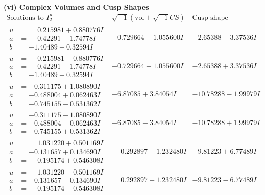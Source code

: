 \documentclass[1p]{elsarticle_modified}
\theoremstyle{definition}
\newcommand{\I}{\sqrt{-1}}
\begin{document}
\newpage\flushleft \textbf{(vi) Complex Volumes and Cusp Shapes}
$$\begin{array}{c|c|c}  
\text{Solutions to }I^u_{2}& \I (\text{vol} + \sqrt{-1}CS) & \text{Cusp shape}\\
 \hline 
\begin{aligned}
u &= \phantom{-}0.215981 + 0.880776 I \\
a &= \phantom{-}0.42291 + 1.74778 I \\
b &= -1.40489 - 0.32594 I\end{aligned}
 & -0.729664 - 1.055600 I & -2.65388 - 3.37536 I \\ \hline\begin{aligned}
u &= \phantom{-}0.215981 - 0.880776 I \\
a &= \phantom{-}0.42291 - 1.74778 I \\
b &= -1.40489 + 0.32594 I\end{aligned}
 & -0.729664 + 1.055600 I & -2.65388 + 3.37536 I \\ \hline\begin{aligned}
u &= -0.311175 + 1.080890 I \\
a &= -0.488004 + 0.062463 I \\
b &= -0.745155 - 0.531362 I\end{aligned}
 & -6.87085 + 3.84054 I & -10.78288 - 1.99979 I \\ \hline\begin{aligned}
u &= -0.311175 - 1.080890 I \\
a &= -0.488004 - 0.062463 I \\
b &= -0.745155 + 0.531362 I\end{aligned}
 & -6.87085 - 3.84054 I & -10.78288 + 1.99979 I \\ \hline\begin{aligned}
u &= \phantom{-}1.031220 + 0.501169 I \\
a &= -0.131657 + 0.134690 I \\
b &= \phantom{-}0.195174 + 0.546308 I\end{aligned}
 & \phantom{-}0.292897 - 1.232480 I & -9.81223 + 6.77489 I \\ \hline\begin{aligned}
u &= \phantom{-}1.031220 - 0.501169 I \\
a &= -0.131657 - 0.134690 I \\
b &= \phantom{-}0.195174 - 0.546308 I\end{aligned}
 & \phantom{-}0.292897 + 1.232480 I & -9.81223 - 6.77489 I \\ \hline\begin{aligned}

\end{aligned}
\end{array}$$
\end{document}

